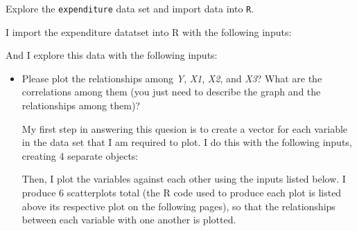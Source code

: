 \documentclass[12pt,letterpaper]{article}
\begin{document}
	\vspace{.5cm}
	\noindent Explore the \texttt{expenditure} data set and import data into \texttt{R}.
	\vspace{.5cm}
	
	I import the expenditure datatset into R with the following inputs:
	  
	
	And I explore this data with the following inputs:
	 
	\vspace{.5cm}
	
	\begin{itemize}
		
		\item
		Please plot the relationships among \emph{Y}, \emph{X1}, \emph{X2}, and \emph{X3}? What are the correlations among them (you just need to describe the graph and the relationships among them)?
		\vspace{.5cm}
		
		My first step in answering this quesion is to create a vector for each variable in the data set that I am required to plot.  I do this with the following inputs, creating 4 separate objects:
		
		 
		
		Then, I plot the variables against each other using the inputs listed below. I produce 6 scatterplots total (the R code used to produce each plot is listed above its respective plot on the following pages), so that the relationships between each variable with one another is plotted.
		
		\newpage
		 
		

\end{itemize}
\end{document}
